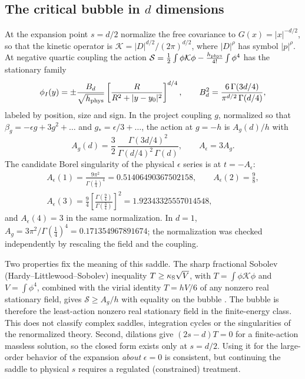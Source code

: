 \documentclass[11pt,a4paper]{article}
\numberwithin{equation}{section}
\newcommand{\Ae}{A_\epsilon}
\newcommand{\Ag}{A_g}
\begin{document}
\subsection{\texorpdfstring{The critical bubble in $d$ dimensions}{The critical bubble in d dimensions}}
At the expansion point $s=d/2$ normalize the free covariance to $G(x)=|x|^{-d/2}$, so
that the kinetic operator is $\mathcal K=|D|^{d/2}/(2\pi)^{d/2}$, where $|D|^\rho$ has symbol
$|p|^\rho$. At negative quartic coupling the action
$\mathcal S=\frac12\int\phi\mathcal K\phi-\frac{h_{\rm phys}}{4!}\int\phi^4$ has the stationary
family
\begin{equation}
 \phi_I(y)=\pm\frac{B_d}{\sqrt{h_{\rm phys}}}
 \left[\frac{R}{R^2+|y-y_0|^2}\right]^{d/4},\qquad
 B_d^2=\frac{6\,\Gamma(3d/4)}{\pi^{d/2}\,\Gamma(d/4)},
 \label{eq:bubble}
\end{equation}
labeled by position, size and sign. In the project coupling $g$, normalized so that
$\beta_g=-\epsilon g+3g^2+\dots$ and $g_*=\epsilon/3+\dots$, the action at $g=-h$ is
$\Ag(d)/h$ with
\begin{equation}
 \Ag(d)=\frac32\,\frac{\Gamma(3d/4)^2}{\Gamma(d/4)^2\,\Gamma(d)},\qquad
 \Ae=3\Ag .
 \label{eq:action}
\end{equation}
The candidate Borel singularity of the physical $\epsilon$ series is at $t=-\Ae$:
\begin{equation}
 \begin{gathered}
 \Ae(1)=\frac{9\pi^2}{\Gamma(\frac14)^4}=0.51406490367502158,\qquad
 \Ae(2)=\frac98,\\
 \Ae(3)=\frac94\left[\frac{\Gamma(\frac94)}{\Gamma(\frac34)}\right]^2=1.92343325557014548,
 \end{gathered}
 \label{eq:actions}
\end{equation}
and $\Ae(4)=3$ in the same normalization. In $d=1$, $\Ag=3\pi^2/\Gamma(\frac14)^4
=0.171354967891674$; the normalization was checked independently by rescaling the field
and the coupling.

Two properties fix the meaning of this saddle. The sharp fractional Sobolev
(Hardy--Littlewood--Sobolev) inequality $T\ge\kappa_{\rm S}\sqrt V$, with $T=\int\phi\mathcal K\phi$ and
$V=\int\phi^4$, combined with the virial identity $T=hV/6$ of any nonzero real stationary
field, gives $\mathcal S\ge\Ag/h$ with equality on the bubble \cite{FrankLieb,ChenLiOu}. The
bubble is therefore the least-action nonzero real stationary field in the finite-energy
class. This does not classify complex saddles, integration cycles or the singularities of
the renormalized theory. Second, dilations give $(2s-d)T=0$ for a finite-action massless
solution, so the closed form exists only at $s=d/2$. Using it for the large-order
behavior of the expansion \emph{about} $\epsilon=0$ is consistent, but continuing the
saddle to physical $s$ requires a regulated (constrained) treatment.
\end{document}
